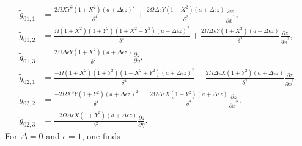 \documentclass{article}
\begin{document}
\begin{align}
\tilde{g}_{01,1}&=\frac{2\Omega XY^3(1+X^2)(a+\Delta \epsilon z)^2}{\delta^4} + \frac{2\Omega \Delta \epsilon Y(1+X^2)(a+\Delta \epsilon z)}{\delta^2} \frac{\partial z}{\partial \tilde{x}^1}, \\
\tilde{g}_{01,2}&=\frac{\Omega (1+X^2)(1+Y^2)(1+X^2-Y^2)(a+\Delta \epsilon z)^2}{\delta^4} + \frac{2\Omega \Delta \epsilon Y(1+X^2)(a+\Delta \epsilon z)}{\delta^2} \frac{\partial z}{\partial \tilde{x}^2}, \\
\tilde{g}_{01,3}&=\frac{2\Omega \Delta \epsilon Y(1+X^2)(a+\Delta \epsilon z)}{\delta^2} \frac{\partial z}{\partial \eta}, \\
\tilde{g}_{02,1}&=\frac{-\Omega (1+X^2)(1+Y^2)(1-X^2+Y^2)(a+\Delta \epsilon z)^2}{\delta^4} - \frac{2\Omega \Delta \epsilon X(1+Y^2)(a+\Delta \epsilon z)}{\delta^2} \frac{\partial z}{\partial \tilde{x}^1}, \\
\tilde{g}_{02,2}&=\frac{-2\Omega X^3Y(1+Y^2)(a+\Delta \epsilon z)^2}{\delta^4} - \frac{2\Omega \Delta \epsilon X(1+Y^2)(a+\Delta \epsilon z)}{\delta^2} \frac{\partial z}{\partial \tilde{x}^2}, \\
\tilde{g}_{02,3}&=\frac{-2\Omega \Delta \epsilon X(1+Y^2)(a+\Delta \epsilon z)}{\delta^2} \frac{\partial z}{\partial \eta}.
\end{align}
For $\Delta=0$ and $\epsilon=1$, one finds
\end{document}
